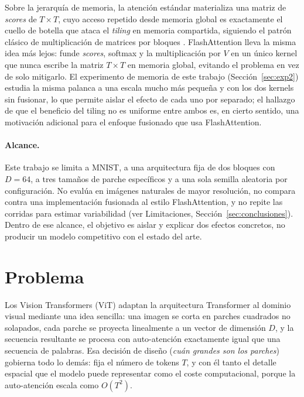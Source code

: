 \documentclass[11pt,a4paper]{article}
\begin{document}
Sobre la jerarquía de memoria, la atención estándar materializa una matriz de
\emph{scores} de $T \times T$, cuyo acceso repetido desde memoria global es
exactamente el cuello de botella que ataca el \emph{tiling} en memoria
compartida, siguiendo el patrón clásico de multiplicación de matrices por
bloques \cite{kirk2016programming}. FlashAttention \cite{dao2022flashattention}
lleva la misma idea más lejos: funde \emph{scores}, softmax y la
multiplicación por $V$ en un único kernel que nunca escribe la matriz
$T\times T$ en memoria global, evitando el problema en vez de solo
mitigarlo. El experimento de memoria de este trabajo
(Sección~\ref{sec:exp2}) estudia la misma palanca a
una escala mucho más pequeña y con los dos kernels sin fusionar, lo que
permite aislar el efecto de cada uno por separado; el hallazgo de que el
beneficio del tiling no es uniforme entre ambos es, en cierto sentido, una
motivación adicional para el enfoque fusionado que usa FlashAttention.

\paragraph{Alcance.} Este trabajo se limita a MNIST, a una arquitectura fija
de dos bloques con $D=64$, a tres tamaños de parche específicos y a una sola
semilla aleatoria por configuración. No evalúa en imágenes naturales de mayor
resolución, no compara contra una implementación fusionada al estilo
FlashAttention, y no repite las corridas para estimar variabilidad (ver
Limitaciones, Sección~\ref{sec:conclusiones}). Dentro de ese alcance, el
objetivo es aislar y explicar dos efectos concretos, no producir un modelo
competitivo con el estado del arte.

\section{Problema}

Los Vision Transformers (ViT) \cite{dosovitskiy2021image} adaptan la arquitectura
Transformer \cite{vaswani2017attention} al dominio visual mediante una idea
sencilla: una imagen se corta en parches cuadrados no solapados, cada parche se
proyecta linealmente a un vector de dimensión $D$, y la secuencia resultante se
procesa con auto-atención exactamente igual que una secuencia de palabras. Esa
decisión de diseño (\emph{cuán grandes son los parches}) gobierna todo lo
demás: fija el número de tokens $T$, y con él tanto el detalle espacial que el
modelo puede representar como el coste computacional, porque la auto-atención
escala como $O(T^2)$.
\end{document}
